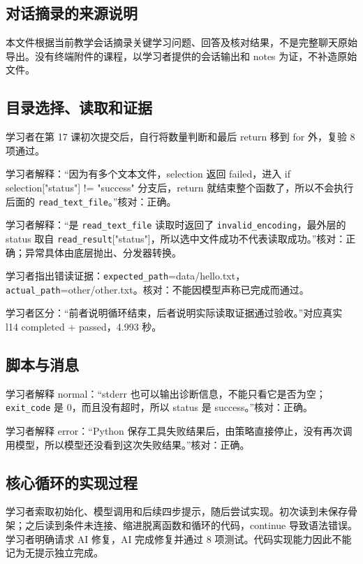 \subsection{对话摘录的来源说明}

本文件根据当前教学会话摘录关键学习问题、回答及核对结果，不是完整聊天原始导出。没有终端附件的课程，以学习者提供的会话输出和 notes 为证，不补造原始文件。

\subsection{目录选择、读取和证据}

学习者在第 17 课初次提交后，自行将数量判断和最后 return 移到 for 外，复验 8 项通过。

学习者解释：“因为有多个文本文件，selection 返回 failed，进入 if selection["status"] != "success" 分支后，return 就结束整个函数了，所以不会执行后面的 \nolinkurl{read_text_file}。”核对：正确。

学习者解释：“是 \nolinkurl{read_text_file} 读取时返回了 \nolinkurl{invalid_encoding}，最外层的 status 取自 \nolinkurl{read_result}["status"]，所以选中文件成功不代表读取成功。”核对：正确；异常具体由底层抛出、分发器转换。

学习者指出错读证据：\nolinkurl{expected_path}=data/hello.txt，\nolinkurl{actual_path}=other/other.txt。核对：不能因模型声称已完成而通过。

学习者区分：“前者说明循环结束，后者说明实际读取证据通过验收。”对应真实 l14 completed + passed，4.993 秒。

\subsection{脚本与消息}

学习者解释 normal：“stderr 也可以输出诊断信息，不能只看它是否为空；\nolinkurl{exit_code} 是 0，而且没有超时，所以 status 是 success。”核对：正确。

学习者解释 error：“Python 保存工具失败结果后，由策略直接停止，没有再次调用模型，所以模型还没看到这次失败结果。”核对：正确。

\subsection{核心循环的实现过程}

学习者索取初始化、模型调用和后续四步提示，随后尝试实现。初次读到未保存骨架；之后读到条件未连接、缩进脱离函数和循环的代码，continue 导致语法错误。学习者明确请求 AI 修复，AI 完成修复并通过 8 项测试。代码实现能力因此不能记为无提示独立完成。


